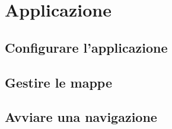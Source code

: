 \documentclass[../ClipsManualeUtente.tex]{subfiles}
\begin{document}
\section{Applicazione}
	\subsection{Configurare l'applicazione}
	
	\subsection{Gestire le mappe}
	
	\subsection{Avviare una navigazione}
\end{document}
